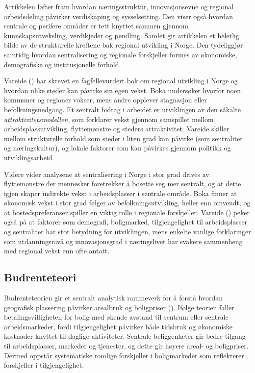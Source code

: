 \documentclass[
  norsk,
  letterpaper,
  DIV=11,
  numbers=noendperiod]{scrartcl}
\begin{document}
Artikkelen løfter fram hvordan næringsstruktur, innovasjonsevne og
regional arbeidsdeling påvirker verdiskaping og sysselsetting. Den viser
også hvordan sentrale og perifere områder er tett knyttet sammen gjennom
kunnskapsutveksling, verdikjeder og pendling. Samlet gir artikkelen et
heletlig bilde av de strukturelle kreftene bak regional utvikling i
Norge. Den tydeliggjør samtidig hvordan sentralisering og regionale
forskjeller formes av økonomiske, demografiske og institusjonelle
forhold.

Vareide () har skrevet en
fagfellevurdert bok om regional utvikling i Norge og hvordan ulike
steder kan påvirke sin egen vekst. Boka undersøker hvorfor noen kommuner
og regioner vokser, mens andre opplever stagnasjon eller
befolkningsnedgang. Et sentralt bidrag i arbeidet er utviklingen av den
såkalte \emph{attraktivitetsmodellen}, som forklarer vekst gjennom
samspillet mellom arbeidsplassutvikling, flyttemønstre og steders
attraktivitet. Vareide skiller mellom strukturelle forhold som steder i
liten grad kan påvirke (som sentralitet og næringskultur), og lokale
faktorer som kan påvirkes gjennom politikk og utviklingsarbeid.

Videre vider analysene at sentralisering i Norge i stor grad drives av
flyttemønstre der mennesker foretrekker å bosette seg mer sentralt, og
at dette igjen skaper indirekte vekst i arbeidsplasser i sentrale
område. Boka finner at økonomisk vekst i stor grad følger av
befolkningsutvikling, heller enn omvendt, og at bostedspreferanser
spiller en viktig rolle i regionale forskjeller. Vareide
() peker også på at faktorer som
demografi, boligmarked, tilgjengelighet til arbeidsplasser og
sentralitet har stor betydning for utviklingen, mens enkelte vanlige
forklaringer som utdanningsnivå og innovasjonsgrad i næringslivet har
svakere sammenheng med regional vekst enn ofte antatt.

\subsection{Budrenteteori}\label{budrenteteori}

Budrenteteorien gir et sentralt analytisk rammeverk for å forstå hvordan
geografisk plassering påvirker arealbruk og boligpriser
(). Ifølge teorien faller
betalingsvilligheten for bolig med økende avstand til sentrum eller
sentrale arbeidsmarkeder, fordi tilgjengelighet påvirker både tidsbruk
og økonomiske kostnader knyttet til daglige aktiviteter. Sentrale
beliggenheter gir bedre tilgang til arbeidsplasser, markeder og
tjenester, og dette gir høyere areal- og boligpriser. Dermed oppstår
systematiske romlige forskjeller i boligmarkedet som reflekterer
forskjeller i tilgjengelighet.
\end{document}

